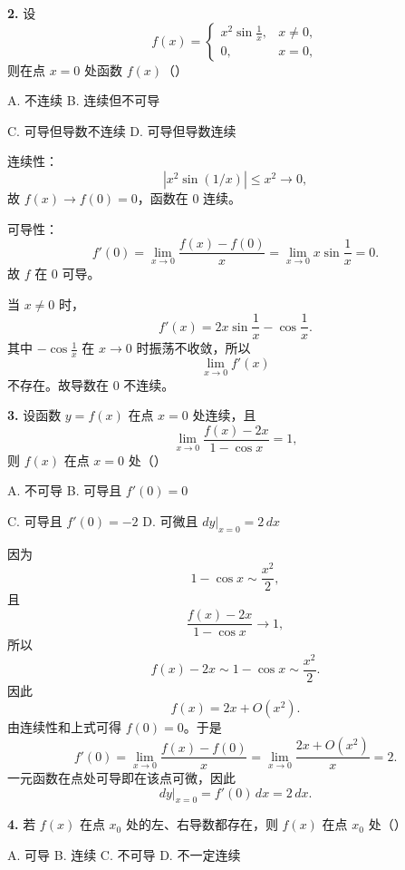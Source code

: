 \begin{problemblock}
\textbf{2.} 设
\[
f(x)=
\begin{cases}
x^2\sin\frac1x,&x\ne0,\\
0,&x=0,
\end{cases}
\]
则在点 \(x=0\) 处函数 \(f(x)\)（\quad）

A. 不连续 \qquad B. 连续但不可导

C. 可导但导数不连续 \qquad D. 可导但导数连续
\end{problemblock}

\begin{solutionblock}
连续性：
\[
|x^2\sin(1/x)|\le x^2\to0,
\]
故 \(f(x)\to f(0)=0\)，函数在 0 连续。

可导性：
\[
f'(0)=\lim_{x\to0}\frac{f(x)-f(0)}x
=\lim_{x\to0}x\sin\frac1x=0.
\]
故 \(f\) 在 0 可导。

当 \(x\ne0\) 时，
\[
f'(x)=2x\sin\frac1x-\cos\frac1x.
\]
其中 \(-\cos\frac1x\) 在 \(x\to0\) 时振荡不收敛，所以
\[
\lim_{x\to0}f'(x)
\]
不存在。故导数在 0 不连续。

\end{solutionblock}

\begin{problemblock}
\textbf{3.} 设函数 \(y=f(x)\) 在点 \(x=0\) 处连续，且
\[
\lim_{x\to0}\frac{f(x)-2x}{1-\cos x}=1,
\]
则 \(f(x)\) 在点 \(x=0\) 处（\quad）

A. 不可导 \qquad B. 可导且 \(f'(0)=0\)

C. 可导且 \(f'(0)=-2\) \qquad D. 可微且 \(\left.dy\right|_{x=0}=2\,dx\)
\end{problemblock}

\begin{solutionblock}
因为
\[
1-\cos x\sim\frac{x^2}{2},
\]
且
\[
\frac{f(x)-2x}{1-\cos x}\to1,
\]
所以
\[
f(x)-2x\sim1-\cos x\sim\frac{x^2}{2}.
\]
因此
\[
f(x)=2x+O(x^2).
\]
由连续性和上式可得 \(f(0)=0\)。于是
\[
f'(0)=\lim_{x\to0}\frac{f(x)-f(0)}x
=\lim_{x\to0}\frac{2x+O(x^2)}x=2.
\]
一元函数在点处可导即在该点可微，因此
\[
\left.dy\right|_{x=0}=f'(0)\,dx=2\,dx.
\]

\end{solutionblock}

\begin{problemblock}
\textbf{4.} 若 \(f(x)\) 在点 \(x_0\) 处的左、右导数都存在，则 \(f(x)\) 在点 \(x_0\) 处（\quad）

A. 可导 \qquad B. 连续 \qquad C. 不可导 \qquad D. 不一定连续
\end{problemblock}

